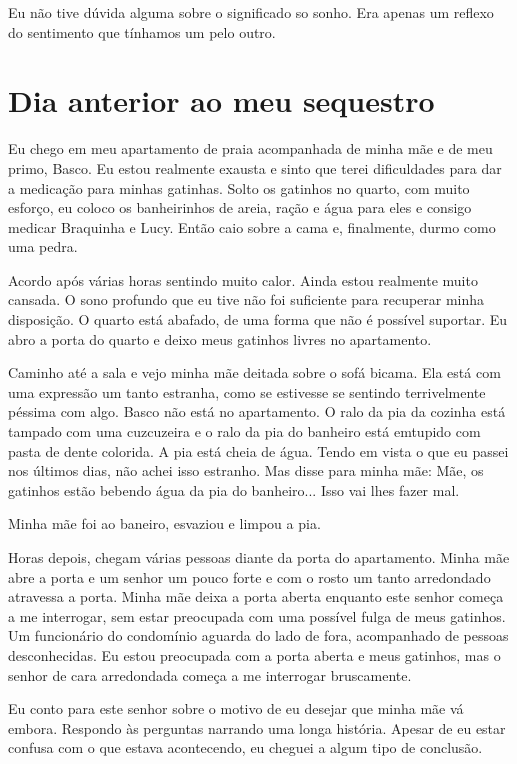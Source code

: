 \documentclass[11pt]{book}
\begin{document}
Eu não tive dúvida alguma sobre o significado so sonho. Era apenas um reflexo do sentimento que tínhamos um pelo outro.

\chapter{Dia anterior ao meu sequestro}

Eu chego em meu apartamento de praia acompanhada de minha mãe e de meu primo, Basco. Eu estou realmente exausta e sinto que terei dificuldades para dar a medicação para minhas gatinhas. Solto os gatinhos no quarto, com muito esforço, eu coloco os banheirinhos de areia, ração e água para eles e consigo medicar Braquinha e Lucy. Então caio sobre a cama e, finalmente, durmo como uma pedra.

Acordo após várias horas sentindo muito calor. Ainda estou realmente muito cansada. O sono profundo que eu tive não foi suficiente para recuperar minha disposição. O quarto está abafado, de uma forma que não é possível suportar. Eu abro a porta do quarto e deixo meus gatinhos livres no apartamento. 

Caminho até a sala e vejo minha mãe deitada sobre o sofá bicama. Ela está com uma expressão um tanto estranha, como se estivesse se sentindo terrivelmente péssima com algo. Basco não está no apartamento. O ralo da pia da cozinha está tampado com uma cuzcuzeira e o ralo da pia do banheiro está emtupido com pasta de dente colorida. A pia está cheia de água. Tendo em vista o que eu passei nos últimos dias, não achei isso estranho. Mas disse para minha mãe: Mãe, os gatinhos estão bebendo água da pia do banheiro... Isso vai lhes fazer mal. 

Minha mãe foi ao baneiro, esvaziou e limpou a pia.

Horas depois, chegam várias pessoas diante da porta do apartamento. Minha mãe abre a porta e um senhor um pouco forte e com o rosto um tanto arredondado atravessa a porta. Minha mãe deixa a porta aberta enquanto este senhor começa a me interrogar, sem estar preocupada com uma possível fulga de meus gatinhos. Um funcionário do condomínio aguarda do lado de fora, acompanhado de pessoas desconhecidas. Eu estou preocupada com a porta aberta e meus gatinhos, mas o senhor de cara arredondada começa a me interrogar bruscamente.

Eu conto para este senhor sobre o motivo de eu desejar que minha mãe vá embora. Respondo às perguntas narrando uma longa história. Apesar de eu estar confusa com o que estava acontecendo, eu cheguei a algum tipo de conclusão. 
\end{document}
